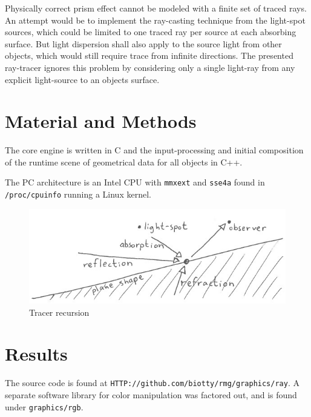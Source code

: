 \documentclass{article}
\begin{document}
Physically correct prism effect cannot be modeled with a
finite set of traced rays.  An attempt would be to implement the
ray-casting technique from the light-spot sources, which could
be limited to one traced ray per source at each absorbing surface.
But light dispersion shall also apply to the source light from other
objects, which would still require trace from infinite directions.
The presented ray-tracer ignores this problem by considering only a single
light-ray from any explicit light-source to an objects surface.

\section{Material and Methods}

The core engine is written in C
and the input-processing and
initial composition of the runtime scene of geometrical data
for all objects in C++.

The PC architecture is an Intel CPU with
\texttt{mmxext} and \texttt{sse4a} found in
\texttt{/proc/cpuinfo} running a Linux kernel.

\begin{figure}
  \includegraphics[width=\linewidth]{ray.jpeg}
  \caption{Tracer recursion}
  \label{fig:ray}
\end{figure}

\section{Results}

The source code is found at
\texttt{HTTP://github.com/biotty/rmg/graphics/ray}.
A separate software library for color manipulation was
factored out, and is found under
\texttt{graphics/rgb}.
\end{document}
